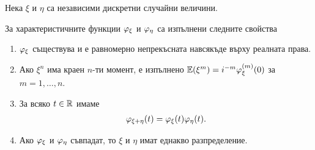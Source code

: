 \documentclass[numbers=endperiod, bibliography=totocnumbered]{scrartcl}
\begin{document}
\begin{theorem}\label{thm:char-props}
  Нека \( \xi \) и \( \eta \) са независими дискретни случайни величини.

  За характеристичните функции \( \varphi_\xi \) и \( \varphi_\eta \) са изпълнени следните свойства
  \begin{enumerate}
    \item \( \varphi_\xi \) съществува и е равномерно непрекъсната навсякъде върху реалната права.

    \item Ако \( \xi^n \) има краен \( n \)-ти момент, е изпълнено \( \mathbb{E}(\xi^m) = i^{-m} \varphi_\xi^{(m)} (0) \) за \( m = 1, \ldots, n \).

    \item За всяко \( t \in \mathbb{R} \) имаме
    \begin{align*}
      \varphi_{\xi + \eta}(t) = \varphi_\xi(t) \varphi_\eta(t).
    \end{align*}

    \item Ако \( \varphi_\xi \) и \( \varphi_\eta \) съвпадат, то \( \xi \) и \( \eta \) имат еднакво разпределение.
  \end{enumerate}
\end{theorem}
\end{document}
